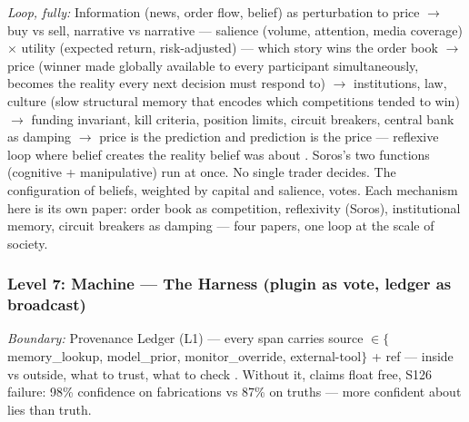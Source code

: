 \documentclass[11pt]{article}
\begin{document}
\textit{Loop, fully:} Information (news, order flow, belief) as perturbation to price $\to$ buy vs sell, narrative vs narrative --- salience (volume, attention, media coverage) $\times$ utility (expected return, risk-adjusted) --- which story wins the order book $\to$ price (winner made globally available to every participant simultaneously, becomes the reality every next decision must respond to) $\to$ institutions, law, culture (slow structural memory that encodes which competitions tended to win) $\to$ funding invariant, kill criteria, position limits, circuit breakers, central bank as damping $\to$ price is the prediction and prediction is the price --- reflexive loop where belief creates the reality belief was about \citep{nayebi2026}. Soros's two functions (cognitive + manipulative) run at once. No single trader decides. The configuration of beliefs, weighted by capital and salience, votes. Each mechanism here is its own paper: order book as competition, reflexivity (Soros), institutional memory, circuit breakers as damping --- four papers, one loop at the scale of society.

\subsubsection{Level 7: Machine --- The Harness (plugin as vote, ledger as broadcast)}

\textit{Boundary:} Provenance Ledger (L1) --- every span carries source $\in\{$memory\_lookup, model\_prior, monitor\_override, external-tool$\}$ + ref --- inside vs outside, what to trust, what to check \citep{gazzaniga2000,johansson2005}. Without it, claims float free, S126 failure: 98\% confidence on fabrications vs 87\% on truths --- more confident about lies than truth.
\end{document}
